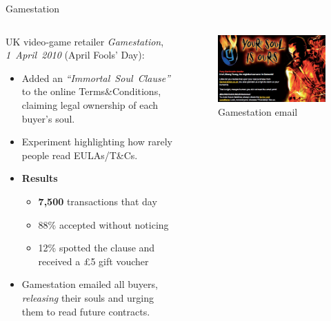 \begin{frame}{Gamestation}
    \begin{columns}[c]
        \begin{block}{UK video‑game retailer \emph{Gamestation}, \textit{1~April~2010} (April Fools' Day):}
            \begin{itemize}
               \item Added an \emph{``Immortal Soul Clause''} to the online Terms\&Conditions, claiming legal ownership of each buyer's soul.
            \item Experiment highlighting how rarely people read EULAs/T\&Cs.
            \item \textbf{Results}
                \begin{itemize}
                \item \textbf{7,500} transactions that day
                \item \alert{88\%} accepted without noticing
                \item \alert{12\%} spotted the clause and received a \pounds5 gift voucher
                \end{itemize}
            \item Gamestation emailed all buyers, \emph{releasing} their souls and urging them to read future contracts.
    
            \end{itemize}
        \end{block}
        \begin{figure}
            \centering
            \includegraphics[height=0.50\textheight]{images/gamestation.jpg}
            \caption{Gamestation email \cite{Soul_EULA}}
            \label{fig:soul}
        \end{figure}
    \end{columns}
\end{frame}

    
    